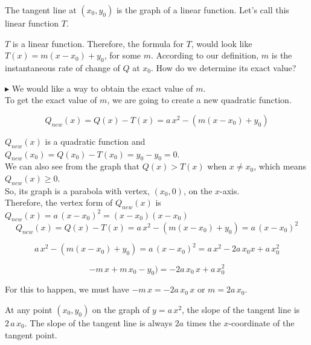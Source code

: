 \documentclass{ximera}
\begin{document}
\begin{explanation}

The tangent line at $(x_0, y_0)$ is the graph of a linear function. Let's call this linear function $T$.


$T$ is a linear function. Therefore, the formula for $T$, would look like $T(x) = m(x - x_0) + y_0$, for some $m$.  According to our definition, $m$ is the instantaneous rate of change of $Q$ at $x_0$.  How do we determine its exact value?


$\blacktriangleright$ We would like a way to obtain the exact value of $m$. \\



To get the exact value of $m$, we are going to create a new quadratic function.



\[
Q_{new}(x) = Q(x) - T(x) = a \, x^2 - (m(x - x_0) + y_0)
\]



$Q_{new}(x)$ is a quadratic function and $Q_{new}(x_0) = Q(x_0) - T(x_0) = y_0 - y_0 = 0$. \\

We can also see from the graph that $Q(x) > T(x)$ when $x \ne x_0$, which means $Q_{new}(x) \geq 0$.\\


So, its graph is a parabola with vertex, $(x_0, 0)$, on the $x$-axis.  \\


Therefore, the vertex form of $Q_{new}(x)$ is $Q_{new}(x) = a \, (x - x_0)^2 = (x - x_0)(x - x_0)$  \\






\[
Q_{new}(x) = Q(x) - T(x) = a \, x^2 - (m(x - x_0) + y_0) = a \, (x - x_0)^2
\]




\[
a \, x^2 - (m(x - x_0) + y_0) = a \, (x - x_0)^2 = a \, x^2 - 2a \, x_0 x + a \, x_0^2
\]



\[
 -m \, x + m \, x_0 - y_0) =   - 2a \, x_0 \, x + a \, x_0^2
\]


For this to happen, we must have $-m \, x = - 2a \, x_0 \, x$ or $m = 2a \, x_0$. \\


\end{explanation}

At any point $(x_0, y_0)$ on the graph of $y = a \, x^2$, the slope of the tangent line is $2 \, a \, x_0$.  The slope of the tangent line is always $2a$ times the $x$-coordinate of the tangent point.
\end{document}
